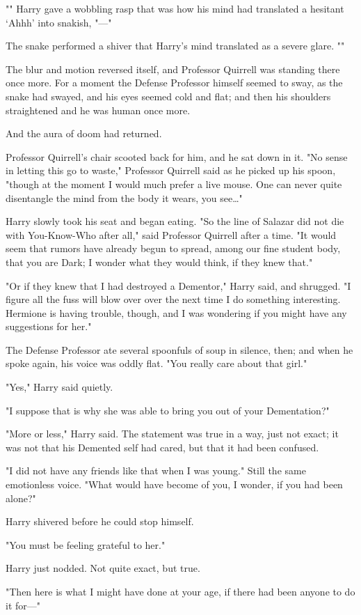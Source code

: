 "" Harry gave a wobbling rasp that was how his mind had 
translated a hesitant `Ahhh' into snakish, "---"

The snake performed a shiver that Harry's mind translated as a severe glare. 
""

The blur and motion reversed itself, and Professor Quirrell was standing there 
once more. For a moment the Defense Professor himself seemed to sway, as the 
snake had swayed, and his eyes seemed cold and flat; and then his shoulders 
straightened and he was human once more.

And the aura of doom had returned.

Professor Quirrell's chair scooted back for him, and he sat down in it. "No 
sense in letting this go to waste," Professor Quirrell said as he picked up his 
spoon, "though at the moment I would much prefer a live mouse. One can never 
quite disentangle the mind from the body it wears, you see{\ldots}"

Harry slowly took his seat and began eating.
\sbreak
"So the line of Salazar did not die with You-Know-Who after all," said 
Professor Quirrell after a time. "It would seem that rumors have already begun 
to spread, among our fine student body, that you are Dark; I wonder what they 
would think, if they knew that."

"Or if they knew that I had destroyed a Dementor," Harry said, and shrugged. "I 
figure all the fuss will blow over over the next time I do something 
interesting. Hermione is having trouble, though, and I was wondering if you 
might have any suggestions for her."

The Defense Professor ate several spoonfuls of soup in silence, then; and when 
he spoke again, his voice was oddly flat. "You really care about that girl."

"Yes," Harry said quietly.

"I suppose that is why she was able to bring you out of your Dementation?"

"More or less," Harry said. The statement was true in a way, just not exact; it 
was not that his Demented self had cared, but that it had been confused.

"I did not have any friends like that when I was young." Still the same 
emotionless voice. "What would have become of you, I wonder, if you had been 
alone?"

Harry shivered before he could stop himself.

"You must be feeling grateful to her."

Harry just nodded. Not quite exact, but true.

"Then here is what I might have done at your age, if there had been anyone to 
do it for---"
